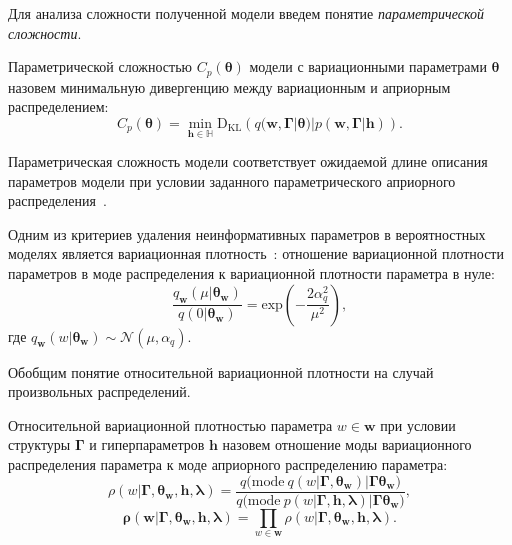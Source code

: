 Для анализа сложности полученной модели введем понятие \textit{параметрической сложности}. 
\begin{defin}
Параметрической сложностью  $C_p(\boldsymbol{\theta})$ модели с вариационными параметрами $\boldsymbol{\theta}$ назовем минимальную дивергенцию между вариационным и априорным распределением:
\[
C_p(\boldsymbol{\theta}) = \min_{\mathbf{h} \in \mathbb{H}} \text{D}_\text{KL}\left(q(\mathbf{w}, \boldsymbol{\Gamma}|\boldsymbol{\theta})|p(\mathbf{w}, \boldsymbol{\Gamma}|\mathbf{h})\right).
\]
\end{defin}
Параметрическая сложность модели соответствует ожидаемой длине описания параметров модели при условии заданного параметрического априорного распределения~\cite{hinton_mdl}.

Одним из критериев удаления неинформативных параметров в вероятностных моделях является вариационная плотность~\cite{nips}: отношение вариационной плотности параметров в моде распределения к вариационной плотности параметра в нуле:
\[
    \frac{q_\mathbf{w}(\mu|\boldsymbol{\theta}_\mathbf{w})}{q(0|\boldsymbol{\theta}_\mathbf{w})} = \text{exp}\left(-\frac{2\alpha_q^2}{\mu^2}\right),
\]
где $q_\mathbf{w}(w|\boldsymbol{\theta}_\mathbf{w}) \sim \mathcal{N}(\mu, \alpha_q).$

Обобщим понятие относительной вариационной плотности на случай произвольных распределений.
\begin{defin}
Относительной вариационной   плотностью параметра $w \in \mathbf{w}$  при условии структуры $\boldsymbol{\Gamma}$ и гиперпараметров $\mathbf{h}$ назовем отношение моды вариационного распределения параметра к моде априорного распределению параметра:
\[
    \rho(w|\boldsymbol{\Gamma}, \boldsymbol{\theta}_\mathbf{w}, \mathbf{h},\boldsymbol{\lambda}) = \frac{q\bigl(\text{mode}~q\left(w|\boldsymbol{\Gamma}, \boldsymbol{\theta}_\mathbf{w}\right)|\boldsymbol{\Gamma}\boldsymbol{\theta}_\mathbf{w}\bigr)}{q\bigl(\text{mode}~p\left({w}|\boldsymbol{\Gamma}, \mathbf{h},\boldsymbol{\lambda}\right)|\boldsymbol{\Gamma}\boldsymbol{\theta}_\mathbf{w}\bigr)},
\]
\[
    \boldsymbol{\rho}(\mathbf{w}|\boldsymbol{\Gamma}, \boldsymbol{\theta}_\mathbf{w}, \mathbf{h},\boldsymbol{\lambda}) = \prod_{w \in \mathbf{w}}\rho(w|\boldsymbol{\Gamma}, \boldsymbol{\theta}_\mathbf{w}, \mathbf{h},\boldsymbol{\lambda}).
\]

\end{defin}

